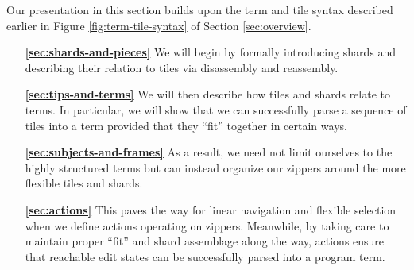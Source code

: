 Our presentation in this section builds upon the term and tile syntax
described earlier in Figure \ref{fig:term-tile-syntax} of
Section \ref{sec:overview}.
\begin{enumerate}
  \item[\textbf{\ref{sec:shards-and-pieces}}]
  We will begin by formally introducing shards
  and describing their relation to tiles via disassembly
  and reassembly.

  \item[\textbf{\ref{sec:tips-and-terms}}]
  We will then describe how tiles and shards relate to
  terms. In particular, we will show that
  we can successfully parse a sequence of tiles
  into a term provided that they ``fit'' together in
  certain ways.

  \item[\textbf{\ref{sec:subjects-and-frames}}]
  As a result, we need not limit ourselves to
  the highly structured terms
  but can instead organize our zippers around the
  more flexible tiles and shards.

  \item[\textbf{\ref{sec:actions}}]
  This paves the way for linear navigation and
  flexible selection when we define actions operating
  on zippers.
  Meanwhile, by taking care to
  maintain proper ``fit'' and shard assemblage along the
  way, actions ensure that reachable edit states can
  be successfully parsed into a program term.

\end{enumerate}




